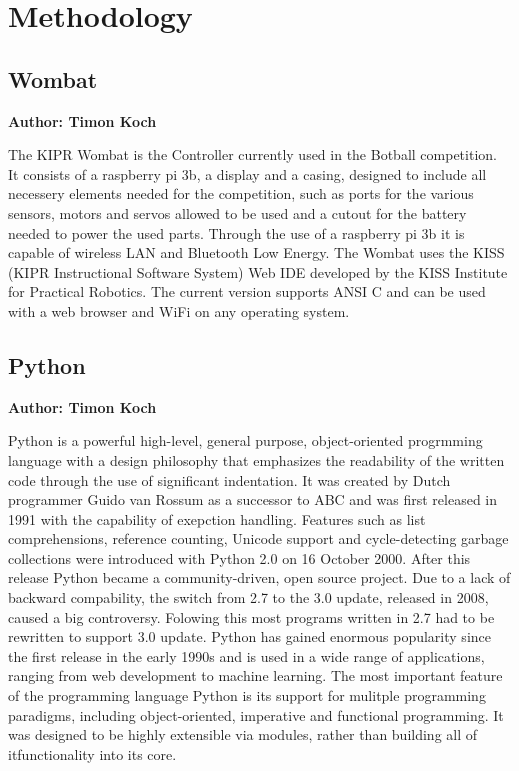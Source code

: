 \chapter{Methodology}

\section{Wombat}
\textbf{Author: Timon Koch}

The KIPR Wombat is the Controller currently used in the Botball competition. It consists of a raspberry pi 3b, a display and a casing, designed to include all necessery elements needed for the competition, such as ports for the various sensors, motors and servos allowed to be used and a cutout for the battery needed to power the used parts. Through the use of a raspberry pi 3b it is capable of wireless LAN and Bluetooth Low Energy. The Wombat uses the KISS (KIPR Instructional Software System) Web IDE developed by the KISS Institute for Practical Robotics. The current version supports ANSI C and can be used with a web browser and WiFi on any operating system.

\section{Python}
\textbf{Author: Timon Koch}

Python is a powerful high-level, general purpose, object-oriented progrmming language with a design philosophy that emphasizes the readability of the written code through the use of significant indentation. 
It was created by Dutch programmer Guido van Rossum as a successor to ABC and was first released in 1991 with the capability of exepction handling. 
Features such as list comprehensions, reference counting, Unicode support and cycle-detecting garbage collections were introduced with Python 2.0 on 16 October 2000. After this release Python became a community-driven, open source project.
Due to a lack of backward compability, the switch from 2.7 to the 3.0 update, released in 2008, caused a big controversy. Folowing this most programs written in 2.7 had to be rewritten to support 3.0 update. 
Python has gained enormous popularity since the first release in the early 1990s and is used in a wide range of applications, ranging from web development to machine learning. 
The most important feature of the programming language Python is its support for mulitple programming paradigms, including object-oriented, imperative and functional programming. It was designed to be highly extensible via modules, rather than building all of itfunctionality into its core.

